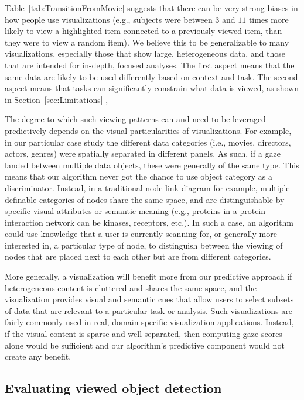 Table~\ref{tab:TransitionFromMovie} suggests that there can be very strong biases in how people use visualizations (e.g., subjects were between $3$ and $11$ times  more likely to view a highlighted item connected to a previously viewed item, than they were to view a random item). We believe this to be generalizable to many visualizations, especially those that show large, heterogeneous data, and those that are intended for in-depth, focused analyses. The first aspect means that the same data are likely to be used differently based on context and task. The second aspect means that  tasks can significantly constrain what data is viewed, as shown in Section~\ref{sec:Limitations} ,   

The degree to which such viewing patterns can and need to be leveraged predictively depends on the visual particularities of visualizations. For example, in our particular case study the different data categories (i.e., movies, directors, actors, genres) were spatially separated in different panels. As such, if a gaze landed between multiple data objects, these were generally of the same type. This means that our algorithm never got the chance to use object category as a discriminator. Instead, in a traditional node link diagram for example, multiple definable categories of nodes share the same space, and are distinguishable by specific visual attributes or semantic meaning (e.g., proteins in a protein interaction network can be kinases, receptors, etc.). In such a case, an algorithm could use knowledge that a user is currently scanning for, or generally more interested in, a particular type of node, to distinguish between the viewing of nodes that are placed next to each other but are from different categories.  

More generally, a visualization will benefit more from our predictive approach if heterogeneous content is cluttered and shares the same space, and the visualization provides visual and semantic cues that allow users to select subsets of  data that are relevant to a particular task or analysis. Such visualizations are fairly commonly used in real, domain specific visualization applications. Instead, if the visual content is sparse and well separated, then computing gaze scores alone would be sufficient and our algorithm's predictive component would not create any benefit.



\subsection{Evaluating viewed object detection} 
\label{sec:DiscussionEvaluatingViewedObjectDetection}

